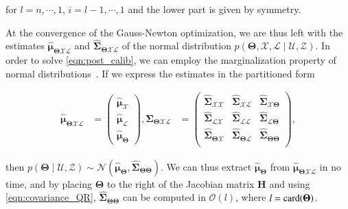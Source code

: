 for $l=n,\cdots,1$, $i=l-1,\cdots,1$ and the lower part is given by symmetry.

At the convergence of the Gauss-Newton optimization, we are thus left with the
estimates $\hat{\boldsymbol{\mu}}_{\boldsymbol{\Theta}\mathcal{X}\mathcal{L}}$
and $\hat{\boldsymbol{\Sigma}}_{\boldsymbol{\Theta}\mathcal{X}\mathcal{L}}$ of
the normal distribution $p(\boldsymbol{\Theta}, \mathcal{X},\mathcal{L}
\mid\mathcal{U},\mathcal{Z})$. In order to solve \eqref{eqn:post_calib}, we can
employ the marginalization property of normal
distributions~\cite{bishop06pattern}. If we express the estimates in the
partitioned form

\begin{equation}\label{eqn:partitioned_estimates}
  \begin{aligned}
  \hat{\boldsymbol{\mu}}_{\boldsymbol{\Theta}\mathcal{X}\mathcal{L}} &=
    \begin{pmatrix}
    \hat{\boldsymbol{\mu}}_{\mathcal{X}}\\
    \hat{\boldsymbol{\mu}}_{\mathcal{L}}\\
    \hat{\boldsymbol{\mu}}_{\boldsymbol{\Theta}}
    \end{pmatrix},
  \hat{\boldsymbol{\Sigma}}_{\boldsymbol{\Theta}\mathcal{X}\mathcal{L}} &=
    \begin{pmatrix}
    \hat{\boldsymbol{\Sigma}}_{\mathcal{X}\mathcal{X}}&
    \hat{\boldsymbol{\Sigma}}_{\mathcal{X}\mathcal{L}}&
    \hat{\boldsymbol{\Sigma}}_{\mathcal{X}\boldsymbol{\Theta}}\\
    \hat{\boldsymbol{\Sigma}}_{\mathcal{L}\mathcal{X}}&
    \hat{\boldsymbol{\Sigma}}_{\mathcal{L}\mathcal{L}}&
    \hat{\boldsymbol{\Sigma}}_{\mathcal{L}\boldsymbol{\Theta}}\\
    \hat{\boldsymbol{\Sigma}}_{\boldsymbol{\Theta}\mathcal{X}}&
    \hat{\boldsymbol{\Sigma}}_{\boldsymbol{\Theta}\mathcal{L}}&
    \hat{\boldsymbol{\Sigma}}_{\boldsymbol{\Theta}\boldsymbol{\Theta}}\\
    \end{pmatrix},
  \end{aligned}
\end{equation}

then $p(\boldsymbol{\Theta}\mid\mathcal{U},\mathcal{Z})\sim\mathcal{N}
(\hat{\boldsymbol{\mu}}_{\boldsymbol{\Theta}},
\hat{\boldsymbol{\Sigma}}_{\boldsymbol{\Theta}\boldsymbol{\Theta}})$. We can
thus extract $\hat{\boldsymbol{\mu}}_{\boldsymbol{\Theta}}$ from
$\hat{\boldsymbol{\mu}}_{\boldsymbol{\Theta}\mathcal{X}\mathcal{L}}$ in no time,
and by placing $\boldsymbol{\Theta}$ to the right of the Jacobian matrix
$\mathbf{H}$ and using \eqref{eqn:covariance_QR},
$\hat{\boldsymbol{\Sigma}}_{\boldsymbol{\Theta}\boldsymbol{\Theta}}$ can be
computed in $\mathcal{O}(l)$, where $l=\operatorname{card}(\boldsymbol{\Theta})$.

